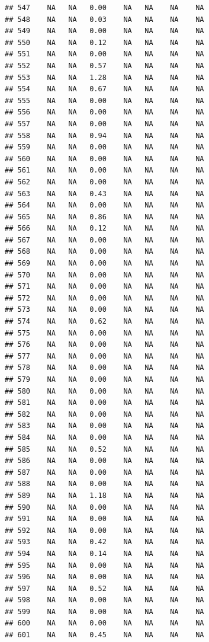 \documentclass{article}\usepackage{graphicx, color}
\makeatletter
\newenvironment{kframe}{%
 \def\at@end@of@kframe{}%
 \ifinner\ifhmode%
  \def\at@end@of@kframe{\end{minipage}}%
  \begin{minipage}{\columnwidth}%
 \fi\fi%
 \def\FrameCommand##1{\hskip\@totalleftmargin \hskip-\fboxsep
 \colorbox{shadecolor}{##1}\hskip-\fboxsep
     \hskip-\linewidth \hskip-\@totalleftmargin \hskip\columnwidth}%
 \MakeFramed {\advance\hsize-\width
   \@totalleftmargin\z@ \linewidth\hsize
   \@setminipage}}%
 {\par\unskip\endMakeFramed%
 \at@end@of@kframe}
\newenvironment{knitrout}{}{} %
\makeatother
\begin{document}
\begin{knitrout}
\begin{kframe}
\begin{verbatim}
## 547    NA   NA   0.00    NA   NA    NA    NA
## 548    NA   NA   0.03    NA   NA    NA    NA
## 549    NA   NA   0.00    NA   NA    NA    NA
## 550    NA   NA   0.12    NA   NA    NA    NA
## 551    NA   NA   0.00    NA   NA    NA    NA
## 552    NA   NA   0.57    NA   NA    NA    NA
## 553    NA   NA   1.28    NA   NA    NA    NA
## 554    NA   NA   0.67    NA   NA    NA    NA
## 555    NA   NA   0.00    NA   NA    NA    NA
## 556    NA   NA   0.00    NA   NA    NA    NA
## 557    NA   NA   0.00    NA   NA    NA    NA
## 558    NA   NA   0.94    NA   NA    NA    NA
## 559    NA   NA   0.00    NA   NA    NA    NA
## 560    NA   NA   0.00    NA   NA    NA    NA
## 561    NA   NA   0.00    NA   NA    NA    NA
## 562    NA   NA   0.00    NA   NA    NA    NA
## 563    NA   NA   0.43    NA   NA    NA    NA
## 564    NA   NA   0.00    NA   NA    NA    NA
## 565    NA   NA   0.86    NA   NA    NA    NA
## 566    NA   NA   0.12    NA   NA    NA    NA
## 567    NA   NA   0.00    NA   NA    NA    NA
## 568    NA   NA   0.00    NA   NA    NA    NA
## 569    NA   NA   0.00    NA   NA    NA    NA
## 570    NA   NA   0.00    NA   NA    NA    NA
## 571    NA   NA   0.00    NA   NA    NA    NA
## 572    NA   NA   0.00    NA   NA    NA    NA
## 573    NA   NA   0.00    NA   NA    NA    NA
## 574    NA   NA   0.62    NA   NA    NA    NA
## 575    NA   NA   0.00    NA   NA    NA    NA
## 576    NA   NA   0.00    NA   NA    NA    NA
## 577    NA   NA   0.00    NA   NA    NA    NA
## 578    NA   NA   0.00    NA   NA    NA    NA
## 579    NA   NA   0.00    NA   NA    NA    NA
## 580    NA   NA   0.00    NA   NA    NA    NA
## 581    NA   NA   0.00    NA   NA    NA    NA
## 582    NA   NA   0.00    NA   NA    NA    NA
## 583    NA   NA   0.00    NA   NA    NA    NA
## 584    NA   NA   0.00    NA   NA    NA    NA
## 585    NA   NA   0.52    NA   NA    NA    NA
## 586    NA   NA   0.00    NA   NA    NA    NA
## 587    NA   NA   0.00    NA   NA    NA    NA
## 588    NA   NA   0.00    NA   NA    NA    NA
## 589    NA   NA   1.18    NA   NA    NA    NA
## 590    NA   NA   0.00    NA   NA    NA    NA
## 591    NA   NA   0.00    NA   NA    NA    NA
## 592    NA   NA   0.00    NA   NA    NA    NA
## 593    NA   NA   0.42    NA   NA    NA    NA
## 594    NA   NA   0.14    NA   NA    NA    NA
## 595    NA   NA   0.00    NA   NA    NA    NA
## 596    NA   NA   0.00    NA   NA    NA    NA
## 597    NA   NA   0.52    NA   NA    NA    NA
## 598    NA   NA   0.00    NA   NA    NA    NA
## 599    NA   NA   0.00    NA   NA    NA    NA
## 600    NA   NA   0.00    NA   NA    NA    NA
## 601    NA   NA   0.45    NA   NA    NA    NA

\end{verbatim}
\end{kframe}
\end{knitrout}
\end{document}
